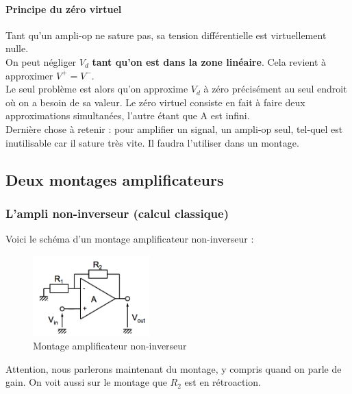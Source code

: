 \documentclass[a4paper]{article}
\begin{document}
    \paragraph{Principe du zéro virtuel} Tant qu'un ampli-op ne sature pas, sa 
    tension différentielle est virtuellement nulle.\\

    On peut négliger $V_d$ \textbf{tant qu'on est dans la zone linéaire}. Cela
    revient à approximer $V^+ = V^-$.\\

    Le seul problème est alors qu'on approxime $V_d$ à zéro précisément au seul
    endroit où on a besoin de sa valeur. Le zéro virtuel consiste en fait à faire
    deux approximations simultanées, l'autre étant que A est infini.\\

    Dernière chose à retenir : pour amplifier un signal, un ampli-op seul, tel-quel
    est inutilisable car il sature très vite. Il faudra l'utiliser dans un montage.


    \subsection{Deux montages amplificateurs}
    \subsubsection{L'ampli non-inverseur (calcul classique)}

    Voici le schéma d'un montage amplificateur non-inverseur : 
    \begin{figure}[H]
        \begin{center}
            \includegraphics[width=0.4\textwidth]{fig/4_montampni.png}
            \caption{Montage amplificateur non-inverseur}
            \label{fig:4_montampni}
        \end{center}
    \end{figure}
    Attention, nous parlerons maintenant du montage, y compris quand on parle de gain.
    On voit aussi sur le montage que $R_2$ est en rétroaction.
\end{document}
